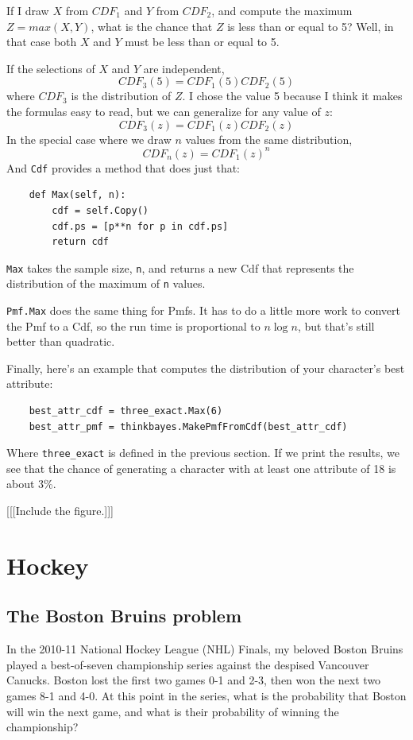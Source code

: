 \documentclass[12pt]{book}
\begin{document}
If I draw $X$ from $CDF_1$ and $Y$ from $CDF_2$, and compute
the maximum $Z = max(X, Y)$, what is the chance that $Z$ is
less than or equal to 5?  Well, in that case both $X$ and $Y$
must be less than or equal to 5.

If the selections of $X$ and $Y$ are independent,
%
\[ CDF_3(5) = CDF_1(5) CDF_2(5) \] 
%
where $CDF_3$ is the distribution of $Z$.  I chose the value
5 because I think it makes the formulas easy to read, but we
can generalize for any value of $z$:
%
\[ CDF_3(z) = CDF_1(z) CDF_2(z) \]
%
In the special case where we draw $n$ values from the same
distribution, 
%
\[ CDF_n(z) = CDF_1(z)^n \]
%
And \verb"Cdf" provides a method that does just that:

\begin{verbatim}
    def Max(self, n):
        cdf = self.Copy()
        cdf.ps = [p**n for p in cdf.ps]
        return cdf
\end{verbatim}

\verb"Max" takes the sample size, {\tt n}, and returns a new
Cdf that represents the distribution of the maximum of {\tt n}
values.

\verb"Pmf.Max" does the same thing for Pmfs.  It has to
do a little more work to convert the Pmf to a Cdf, so the
run time is proportional to $n \log n$, but that's still
better than quadratic.

Finally, here's an example that computes the distribution of
your character's best attribute:

\begin{verbatim}
    best_attr_cdf = three_exact.Max(6)
    best_attr_pmf = thinkbayes.MakePmfFromCdf(best_attr_cdf)
\end{verbatim}

Where \verb"three_exact" is defined in the previous section.
If we print the results, we see that the chance of generating
a character with at least one attribute of 18 is about 3\%.

[[[Include the figure.]]]


\chapter{Hockey}

\section{The Boston Bruins problem}

In the 2010-11 National Hockey League (NHL) Finals, my beloved Boston
Bruins played a best-of-seven championship series against the despised
Vancouver Canucks.  Boston lost the first two games 0-1 and 2-3, then
won the next two games 8-1 and 4-0.  At this point in the series, what
is the probability that Boston will win the next game, and what is
their probability of winning the championship?
\end{document}
